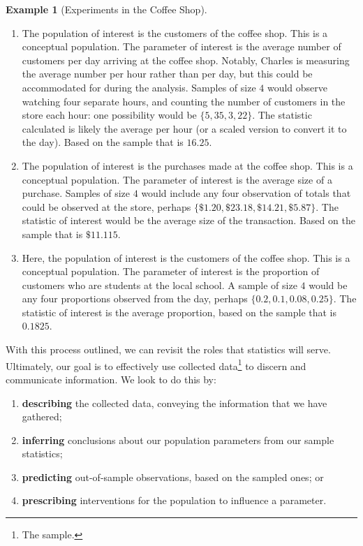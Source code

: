 \documentclass[
  letterpaper,
  DIV=11,
  numbers=noendperiod]{scrreprt}
\providecommand{\tightlist}{%
  \setlength{\itemsep}{0pt}\setlength{\parskip}{0pt}}\usepackage{longtable,booktabs,array}
\theoremstyle{definition}
\theoremstyle{definition}
\newtheorem{example}{Example}[chapter]
\theoremstyle{definition}
\theoremstyle{remark}
\begin{document}
\begin{example}[Experiments in the Coffee
Shop]
\begin{tcolorbox}[enhanced jigsaw, colback=white, colframe=quarto-callout-color-frame, arc=.35mm, leftrule=.75mm, rightrule=.15mm, opacityback=0, breakable, bottomrule=.15mm, left=2mm, toprule=.15mm]
\begin{enumerate}
\def\labelenumi{\alph{enumi}.}
\tightlist
\item
  The population of interest is the customers of the coffee shop. This
  is a conceptual population. The parameter of interest is the average
  number of customers per day arriving at the coffee shop. Notably,
  Charles is measuring the average number per hour rather than per day,
  but this could be accommodated for during the analysis. Samples of
  size \(4\) would observe watching four separate hours, and counting
  the number of customers in the store each hour: one possibility would
  be \(\{5, 35, 3, 22\}\). The statistic calculated is likely the
  average per hour (or a scaled version to convert it to the day). Based
  on the sample that is \(16.25\).
\item
  The population of interest is the purchases made at the coffee shop.
  This is a conceptual population. The parameter of interest is the
  average size of a purchase. Samples of size \(4\) would include any
  four observation of totals that could be observed at the store,
  perhaps \(\{\$1.20, \$23.18, \$14.21, \$5.87\}\). The statistic of
  interest would be the average size of the transaction. Based on the
  sample that is \(\$11.115\).
\item
  Here, the population of interest is the customers of the coffee shop.
  This is a conceptual population. The parameter of interest is the
  proportion of customers who are students at the local school. A sample
  of size \(4\) would be any four proportions observed from the day,
  perhaps \(\{0.2, 0.1, 0.08, 0.25\}\). The statistic of interest is the
  average proportion, based on the sample that is \(0.1825\).
\end{enumerate}

\end{tcolorbox}

\end{example}

With this process outlined, we can revisit the roles that statistics
will serve. Ultimately, our goal is to effectively use collected
data\footnote{The sample.} to discern and communicate information. We
look to do this by:

\begin{enumerate}
\def\labelenumi{\arabic{enumi}.}
\tightlist
\item
  \textbf{describing} the collected data, conveying the information that
  we have gathered;
\item
  \textbf{inferring} conclusions about our population parameters from
  our sample statistics;
\item
  \textbf{predicting} out-of-sample observations, based on the sampled
  ones; or
\item
  \textbf{prescribing} interventions for the population to influence a
  parameter.
\end{enumerate}
\end{document}
